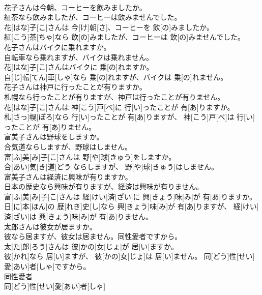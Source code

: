 \documentclass[8pt]{extreport}
\begin{document}
\begin{CJK}{UTF8}{min}
\\	花子さんは今朝、コーヒーを飲みましたか。 
\\	紅茶なら飲みましたが、コーヒーは飲みませんでした。	
\\	花[はな]子[こ]さんは 今[け]朝[さ]、コーヒーを 飲[の]みましたか。 
\\	紅[こう]茶[ちゃ]なら 飲[の]みましたが、コーヒーは 飲[の]みませんでした。
\\	花子さんはバイクに乗れますか。 
\\	自転車なら乗れますが、バイクは乗れません。	
\\	花[はな]子[こ]さんはバイクに 乗[の]れますか。 
\\	自[じ]転[てん]車[しゃ]なら 乗[の]れますが、バイクは 乗[の]れません。
\\	花子さんは神戸に行ったことが有りますか。 
\\	札幌なら行ったことが有りますが、神戸は行ったことが有りません。	
\\	花[はな]子[こ]さんは 神[こう]戸[べ]に 行[い]ったことが 有[あ]りますか。 
\\	札[さっ]幌[ぽろ]なら 行[い]ったことが 有[あ]りますが、 神[こう]戸[べ]は 行[い]ったことが 有[あ]りません。
\\	富美子さんは野球をしますか。 
\\	合気道ならしますが、野球はしません。	
\\	富[ふ]美[み]子[こ]さんは 野[や]球[きゅう]をしますか。 
\\	合[あい]気[き]道[どう]ならしますが、 野[や]球[きゅう]はしません。
\\	富美子さんは経済に興味が有りますか。 
\\	日本の歴史なら興味が有りますが、経済は興味が有りません。	
\\	富[ふ]美[み]子[こ]さんは 経[けい]済[ざい]に 興[きょう]味[み]が 有[あ]りますか。 
\\	日[に]本[ほん]の 歴[れき]史[し]なら 興[きょう]味[み]が 有[あ]りますが、 経[けい]済[ざい]は 興[きょう]味[み]が 有[あ]りません。
\\	太郎さんは彼女が居ますか。 
\\	彼なら居ますが、彼女は居ません。同性愛者ですから。	
\\	太[た]郎[ろう]さんは 彼[かの]女[じょ]が 居[い]ますか。 
\\	彼[かれ]なら 居[い]ますが、 彼[かの]女[じょ]は 居[い]ません。 同[どう]性[せい]愛[あい]者[しゃ]ですから。
\\	同性愛者	
\\	同[どう]性[せい]愛[あい]者[しゃ]	

\end{CJK}
\end{document}
